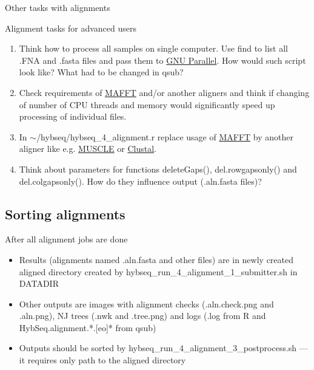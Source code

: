 \documentclass[compress, ucs, xelatex, 11pt, xcolor=x11names, aspectratio=169,
	hyperref={
		bookmarks=true,
		unicode=true,
		colorlinks=true,
		pdftitle={HybSeq course},
		plainpages=false,
		pdfauthor={Vojtech Zeisek},
		pdfsubject={Practical processing of HybSeq target enrichment sequencing data on computing grids like MetaCentrum},
		pdfcreator={XeLaTeX},
		pdfkeywords={BASH, command line, GNU, HybSeq, Linux, MetaCentrum, sequencing shell, target enrichment},
		linkcolor=Turquoise4, %
		anchorcolor=DodgerBlue4, %
		citecolor=DodgerBlue4, %
		filecolor=DodgerBlue4, %
		menucolor=Tan4, %
		urlcolor=DarkOliveGreen4, %
		pdftex},
	url={hyphens, lowtilde} %
	]{beamer}
\renewcommand{\texttt}[1]{\colorbox{Cornsilk2}{{\ttfamily #1}}}
\begin{document}
\begin{frame}{Other tasks with alignments}
	\begin{exampleblock}{Alignment tasks for advanced users}
		\begin{enumerate}
			\item Think how to process all samples on single computer. Use \texttt{find} to list all \texttt{*.FNA} and \texttt{*.fasta} files and pass them to \href{https://www.gnu.org/software/parallel/}{GNU Parallel}. How would such script look like? What had to be changed in \texttt{qsub}?
			\item Check requirements of \href{https://mafft.cbrc.jp/alignment/software/}{MAFFT} and/or another aligners and think if changing of number of CPU threads and memory would significantly speed up processing of individual files.
			\item In \texttt{$\sim$/hybseq/hybseq\_4\_alignment.r} replace usage of \href{https://mafft.cbrc.jp/alignment/software/}{MAFFT} by another aligner like e.g. \href{https://www.drive5.com/muscle/}{MUSCLE} or \href{http://clustal.org/}{Clustal}.
			\item Think about parameters for functions \texttt{deleteGaps()}, \texttt{del.rowgapsonly()} and \texttt{del.colgapsonly()}. How do they influence output (\texttt{*.aln.fasta} files)?
		\end{enumerate}
	\end{exampleblock}
\end{frame}

\subsection{Sorting alignments}

\begin{frame}{After all alignment jobs are done}
	\begin{itemize}
		\item Results (alignments named \texttt{*.aln.fasta} and other files) are in newly created \texttt{aligned} directory created by \texttt{hybseq\_run\_4\_alignment\_1\_submitter.sh} in \texttt{DATADIR}
		\item Other outputs are images with alignment checks (\texttt{*.aln.check.png} and \texttt{*.aln.png}), NJ trees (\texttt{*.nwk} and \texttt{*.tree.png}) and logs (\texttt{*.log} from \texttt{R} and \texttt{HybSeq.alignment.*.[eo]*} from \texttt{qsub})
		\item Outputs should be sorted by \texttt{hybseq\_run\_4\_alignment\_3\_postprocess.sh} --- it requires only path to the \texttt{aligned} directory
	\end{itemize}
\end{frame}
\end{document}
